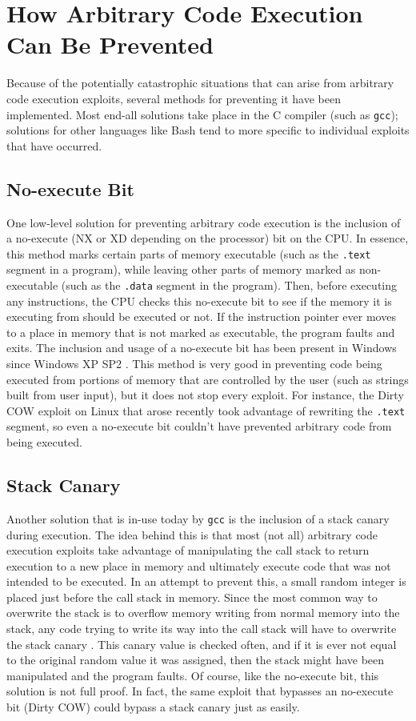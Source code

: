 \section{How Arbitrary Code Execution Can Be Prevented}

Because of the potentially catastrophic situations that can arise from arbitrary code execution exploits, several methods for preventing it have been implemented. Most end-all solutions take place in the C compiler (such as \texttt{gcc}); solutions for other languages like Bash tend to more specific to individual exploits that have occurred.

\subsection{No-execute Bit}

One low-level solution for preventing arbitrary code execution is the inclusion of a no-execute (NX or XD depending on the processor) bit on the CPU. In essence, this method marks certain parts of memory executable (such as the \texttt{.text} segment in a program), while leaving other parts of memory marked as non-executable (such as the \texttt{.data} segment in the program). Then, before executing any instructions, the CPU checks this no-execute bit to see if the memory it is executing from should be executed or not. If the instruction pointer ever moves to a place in memory that is not marked as executable, the program faults and exits. The inclusion and usage of a no-execute bit has been present in Windows since Windows XP SP2 \cite{andersen_abella_2004}. This method is very good in preventing code being executed from portions of memory that are controlled by the user (such as strings built from user input), but it does not stop every exploit. For instance, the Dirty COW exploit on Linux that arose recently took advantage of rewriting the \texttt{.text} segment, so even a no-execute bit couldn’t have prevented arbitrary code from being executed.

\subsection{Stack Canary}

Another solution that is in-use today by \texttt{gcc} is the inclusion of a stack canary during execution. The idea behind this is that most (not all) arbitrary code execution exploits take advantage of manipulating the call stack to return execution to a new place in memory and ultimately execute code that was not intended to be executed. In an attempt to prevent this, a small random integer is placed just before the call stack in memory. Since the most common way to overwrite the stack is to overflow memory writing from normal memory into the stack, any code trying to write its way into the call stack will have to overwrite the stack canary \cite{dowd_mcdonald_schuh_2006}. This canary value is checked often, and if it is ever not equal to the original random value it was assigned, then the stack might have been manipulated and the program faults. Of course, like the no-execute bit, this solution is not full proof. In fact, the same exploit that bypasses an no-execute bit (Dirty COW) could bypass a stack canary just as easily.

